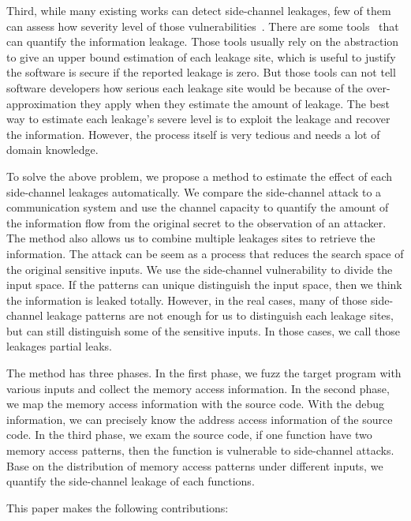 Third, while many existing works can detect side-channel leakages, few of them can assess how severity level of those vulnerabilities~\cite{wang2017cached,doychev2015cacheaudit,brotzman2019casym,wang2019identifying,weiser2018data,wichelmann2018microwalk}. There are some tools~\cite{doychev2015cacheaudit,chattopadhyay2019quantifying} that can quantify the information leakage.  Those tools usually rely on the abstraction to give an upper bound estimation of each leakage site, which is useful to justify the software is secure if the reported leakage is zero. But those tools can not tell software developers how serious each leakage site would be because of the over-approximation they apply when they estimate the amount of leakage. The best way to estimate each leakage's severe level is to exploit the leakage and recover the information. However, the process itself is very tedious and needs a lot of domain knowledge.

To solve the above problem, we propose a method to estimate the effect of each side-channel leakages automatically. We compare the side-channel attack to a communication system and use the channel capacity to quantify the amount of the information flow from the original secret to the observation of an attacker. The method also allows us to combine multiple leakages sites to retrieve the information. The  attack can be seem as a process that reduces the search space of the original sensitive inputs. We use the side-channel vulnerability to divide the input space. If the patterns can unique distinguish the input space, then we think the information is leaked totally. However, in the real cases, many of those side-channel leakage patterns are not enough for us to distinguish each leakage sites, but can still distinguish some of the sensitive inputs. In those cases, we call those leakages partial leaks.

The method has three phases. In the first phase, we fuzz the target program with various inputs and collect the memory access information. In the second phase, we map the memory access information with the source code. With the debug information, we can precisely know the address access information of the source code. In the third phase, we exam the source code, if one function have two memory access patterns, then the function is vulnerable to side-channel attacks. Base on the distribution of memory access patterns under different inputs, we quantify the side-channel leakage of each functions.

This paper makes the following contributions:


